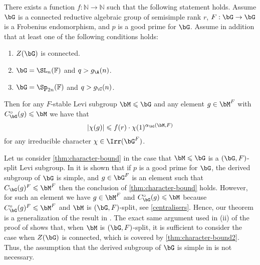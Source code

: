 \documentclass[eqthmnum,nocolour,skinny]{jt-calcs}
\begin{document}

\begin{thm}\label{thm:character-bound2}
There exists a function $f : \mathbb{N} \to \mathbb{N}$ such that the following statement holds. Assume $\bG$ is a connected reductive algebraic group of semisimple rank $r$, $F : \bG \to \bG$ is a Frobenius endomorphism, and $p$ is a good prime for $\bG$. Assume in addition that at least one of the following conditions holds:
\begin{enumerate}
         \item $Z(\bG)$ is connected.
	 \item $\bG = \SL_n(\mathbb{F})$ and $q > g_{\A}(n)$.
	\item $\bG = \Sp_{2n}(\mathbb{F})$ and $q > g_{\C}(n)$. 
\end{enumerate}
Then for any $F$-stable Levi subgroup $\bM \leqslant \bG$ and any element $g \in \bM^F$ with $C_{\bG}^{\circ}(g) \leqslant \bM$ we have that
\begin{equation*}
|\chi(g)| \leqslant f(r)\cdot\chi(1)^{\alpha_{\bG}(\bM,F)}
\end{equation*}
for any irreducible character $\chi \in \Irr(\bG^F)$.
\end{thm}

\begin{pa}
Let us consider \cref{thm:character-bound} in the case that $\bM \leqslant \bG$ is a $(\bG,F)$-split Levi subgroup. In \cite{bezrukavnikov-liebeck-shalev-tiep:2017:character-bounds-grps-Lie-type} it is shown that if $p$ is a good prime for $\bG$, the derived subgroup of $\bG$ is simple, and $g \in \bG^F$ is an element such that $C_{\bG}(g)^F \leqslant \bM^F$ then the conclusion of \cref{thm:character-bound} holds. However, for such an element we have $g \in \bM^F$ and $C_{\bG}^{\circ}(g) \leqslant \bM$ because $C_{\bG}^{\circ}(g)^F \leqslant \bM^F$ and $\bM$ is $(\bG,F)$-split, see \cref{centralisers}. Hence, our theorem is a generalization of the result in \cite{bezrukavnikov-liebeck-shalev-tiep:2017:character-bounds-grps-Lie-type}. The exact same argument used in (ii) of the proof of \cite[Thm.~1.1]{bezrukavnikov-liebeck-shalev-tiep:2017:character-bounds-grps-Lie-type} shows that, when $\bM$ is $(\bG,F)$-split, it is sufficient to consider the case when $Z(\bG)$ is connected, which is covered by \cref{thm:character-bound2}. Thus, the assumption that the derived subgroup of $\bG$ is simple in \cite{bezrukavnikov-liebeck-shalev-tiep:2017:character-bounds-grps-Lie-type} is not necessary.
\end{pa}
\end{document}
